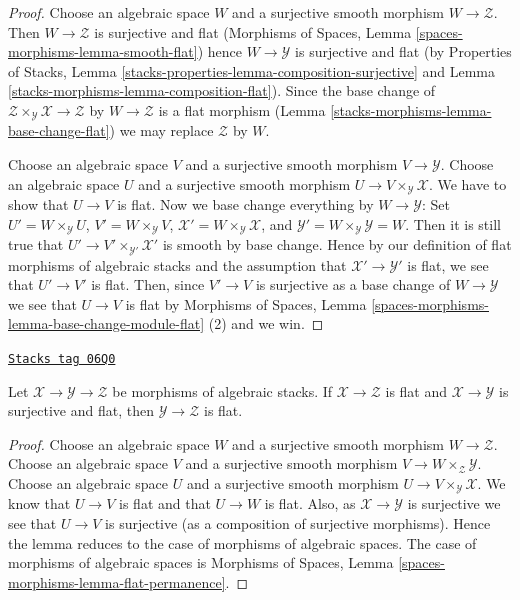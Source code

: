 \begin{proof}
Choose an algebraic space $W$ and a surjective smooth morphism
$W \to \mathcal{Z}$. Then $W \to \mathcal{Z}$ is surjective and flat
(Morphisms of Spaces, Lemma \ref{spaces-morphisms-lemma-smooth-flat})
hence $W \to \mathcal{Y}$ is surjective and flat (by
Properties of Stacks, Lemma
\ref{stacks-properties-lemma-composition-surjective}
and
Lemma \ref{stacks-morphisms-lemma-composition-flat}).
Since the base change of
$\mathcal{Z} \times_\mathcal{Y} \mathcal{X} \to \mathcal{Z}$
by $W \to \mathcal{Z}$ is a flat morphism
(Lemma \ref{stacks-morphisms-lemma-base-change-flat})
we may replace $\mathcal{Z}$ by $W$.

\medskip\noindent
Choose an algebraic space $V$ and a surjective smooth morphism
$V \to \mathcal{Y}$. Choose an algebraic space $U$ and a surjective
smooth morphism $U \to V \times_\mathcal{Y} \mathcal{X}$.
We have to show that $U \to V$ is flat. Now we base change
everything by $W \to \mathcal{Y}$: Set $U' = W \times_\mathcal{Y} U$,
$V' = W \times_\mathcal{Y} V$,
$\mathcal{X}' = W \times_\mathcal{Y} \mathcal{X}$,
and $\mathcal{Y}' = W \times_\mathcal{Y} \mathcal{Y} = W$.
Then it is still true that $U' \to V' \times_{\mathcal{Y}'} \mathcal{X}'$
is smooth by base change. Hence by our definition of flat morphisms
of algebraic stacks and the assumption that $\mathcal{X}' \to \mathcal{Y}'$
is flat, we see that $U' \to V'$ is flat. Then, since
$V' \to V$ is surjective as a base change of $W \to \mathcal{Y}$ we see
that $U \to V$ is flat by
Morphisms of Spaces, Lemma
\ref{spaces-morphisms-lemma-base-change-module-flat} (2)
and we win.
\end{proof}

\begin{lemma}
\label{stacks-morphisms-lemma-flat-permanence}
\href{https://stacks.math.columbia.edu/tag/06Q0}{\texttt{Stacks tag 06Q0}}

Let $\mathcal{X} \to \mathcal{Y} \to \mathcal{Z}$ be morphisms of
algebraic stacks. If $\mathcal{X} \to \mathcal{Z}$ is flat
and $\mathcal{X} \to \mathcal{Y}$ is surjective and flat, then
$\mathcal{Y} \to \mathcal{Z}$ is flat.
\end{lemma}

\begin{proof}
Choose an algebraic space $W$ and a surjective smooth morphism
$W \to \mathcal{Z}$. Choose an algebraic space $V$ and a surjective smooth
morphism $V \to W \times_\mathcal{Z} \mathcal{Y}$. Choose an algebraic space
$U$ and a surjective smooth morphism $U \to V \times_\mathcal{Y} \mathcal{X}$.
We know that $U \to V$ is flat and that $U \to W$ is flat.
Also, as $\mathcal{X} \to \mathcal{Y}$ is surjective we see that
$U \to V$ is surjective (as a composition of surjective morphisms).
Hence the lemma reduces to the case of morphisms of algebraic spaces.
The case of morphisms of algebraic spaces is
Morphisms of Spaces, Lemma
\ref{spaces-morphisms-lemma-flat-permanence}.
\end{proof}

